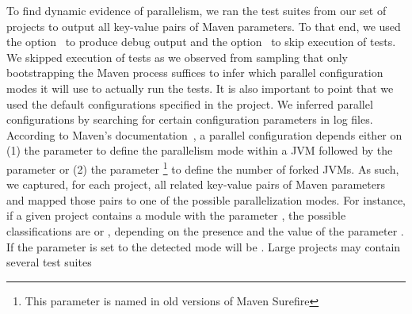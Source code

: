 To find dynamic evidence of parallelism, we ran the test suites from
our set of \numMedLong{} projects to output all key-value pairs of
Maven parameters.  To that end, we used the option~ to
produce debug output and the option~ to skip
execution of tests.  We skipped execution of tests as we observed from
sampling that only bootstrapping the Maven process suffices to infer
which parallel configuration modes it will use to actually run the
tests.  It is also important to point that we used the default
configurations specified in the project.  We inferred parallel
configurations by searching for certain configuration parameters in
log files. According to Maven's
documentation~\cite{maven-surefire-plugin}, a parallel configuration
depends either on (1) the parameter  to define the
parallelism mode within a JVM followed by the parameter
 or (2) the parameter
\footnote{This parameter is named 
  in old versions of Maven Surefire} to define the number of forked
JVMs.  As such, we captured, for each project, all related key-value
pairs of Maven parameters and mapped those pairs to one of the
possible parallelization modes.  For instance, if a given project
contains a module with the parameter
, the possible classifications are
\ForkSeq{} or \ForkParMeth{}, depending on the presence and the value
of the parameter .  If the parameter
 is set to  the detected mode will be
\ForkParMeth{}.  Large projects may contain several test suites
